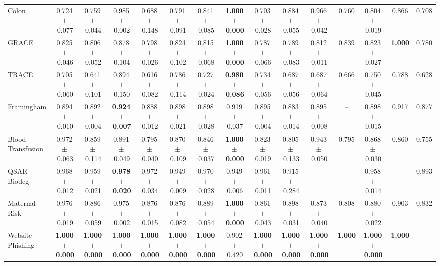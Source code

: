 \documentclass[8pt]{extarticle}
\begin{document}
\begin{longtable}{l*{14}{c}}
Colon & 0.724\,$\pm$\,0.077 & 0.759\,$\pm$\,0.044 & 0.985\,$\pm$\,0.002 & 0.688\,$\pm$\,0.148 & 0.791\,$\pm$\,0.091 & 0.841\,$\pm$\,0.085 & \textbf{1.000\,$\pm$\,0.000} & 0.703\,$\pm$\,0.028 & 0.884\,$\pm$\,0.055 & 0.966\,$\pm$\,0.042 & 0.760 & 0.804\,$\pm$\,0.019 & 0.866 & 0.708 \\
GRACE & 0.825\,$\pm$\,0.046 & 0.806\,$\pm$\,0.052 & 0.878\,$\pm$\,0.104 & 0.798\,$\pm$\,0.026 & 0.824\,$\pm$\,0.102 & 0.815\,$\pm$\,0.068 & \textbf{1.000\,$\pm$\,0.000} & 0.787\,$\pm$\,0.066 & 0.789\,$\pm$\,0.083 & 0.812\,$\pm$\,0.011 & 0.839 & 0.823\,$\pm$\,0.027 & \textbf{1.000} & 0.780 \\
TRACE & 0.705\,$\pm$\,0.060 & 0.641\,$\pm$\,0.101 & 0.894\,$\pm$\,0.150 & 0.616\,$\pm$\,0.082 & 0.786\,$\pm$\,0.114 & 0.727\,$\pm$\,0.024 & \textbf{0.980\,$\pm$\,0.086} & 0.734\,$\pm$\,0.056 & 0.687\,$\pm$\,0.056 & 0.687\,$\pm$\,0.064 & 0.666 & 0.750\,$\pm$\,0.045 & 0.788 & 0.628 \\
Framingham & 0.894\,$\pm$\,0.010 & 0.892\,$\pm$\,0.004 & \textbf{0.924\,$\pm$\,0.007} & 0.888\,$\pm$\,0.012 & 0.898\,$\pm$\,0.021 & 0.898\,$\pm$\,0.028 & 0.919\,$\pm$\,0.037 & 0.895\,$\pm$\,0.004 & 0.883\,$\pm$\,0.014 & 0.895\,$\pm$\,0.008 & -- & 0.898\,$\pm$\,0.015 & 0.917 & 0.877 \\
Blood Transfusion & 0.972\,$\pm$\,0.063 & 0.859\,$\pm$\,0.114 & 0.891\,$\pm$\,0.049 & 0.795\,$\pm$\,0.040 & 0.870\,$\pm$\,0.109 & 0.846\,$\pm$\,0.037 & \textbf{1.000\,$\pm$\,0.000} & 0.823\,$\pm$\,0.019 & 0.805\,$\pm$\,0.133 & 0.943\,$\pm$\,0.050 & 0.795 & 0.868\,$\pm$\,0.030 & 0.860 & 0.755 \\
QSAR Biodeg & 0.968\,$\pm$\,0.012 & 0.959\,$\pm$\,0.021 & \textbf{0.978\,$\pm$\,0.020} & 0.972\,$\pm$\,0.034 & 0.949\,$\pm$\,0.009 & 0.970\,$\pm$\,0.028 & 0.949\,$\pm$\,0.006 & 0.961\,$\pm$\,0.011 & 0.915\,$\pm$\,0.284 & -- & -- & 0.958\,$\pm$\,0.014 & -- & 0.893 \\
Maternal Risk & 0.976\,$\pm$\,0.019 & 0.886\,$\pm$\,0.059 & 0.975\,$\pm$\,0.002 & 0.876\,$\pm$\,0.015 & 0.876\,$\pm$\,0.082 & 0.889\,$\pm$\,0.054 & \textbf{1.000\,$\pm$\,0.000} & 0.861\,$\pm$\,0.043 & 0.898\,$\pm$\,0.031 & 0.873\,$\pm$\,0.040 & 0.808 & 0.880\,$\pm$\,0.022 & 0.903 & 0.832 \\
Website Phishing & \textbf{1.000\,$\pm$\,0.000} & \textbf{1.000\,$\pm$\,0.000} & \textbf{1.000\,$\pm$\,0.000} & \textbf{1.000\,$\pm$\,0.000} & \textbf{1.000\,$\pm$\,0.000} & \textbf{1.000\,$\pm$\,0.000} & 0.902\,$\pm$\,0.420 & \textbf{1.000\,$\pm$\,0.000} & \textbf{1.000\,$\pm$\,0.000} & \textbf{1.000\,$\pm$\,0.000} & \textbf{1.000} & \textbf{1.000\,$\pm$\,0.000} & \textbf{1.000} & -- \\
\end{longtable}
\end{document}
